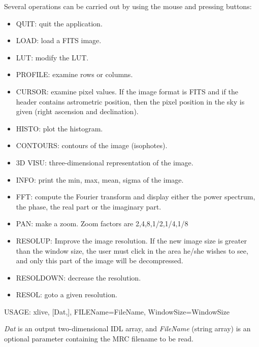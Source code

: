 Several operations can be carried out by using the mouse and pressing buttons:
\begin{itemize}
\baselineskip=0.4truecm
\item QUIT: quit the application.
\item LOAD: load a FITS image. 
\item LUT: modify the LUT.
\item PROFILE: examine rows or columns.
\item CURSOR: examine pixel values. If the image format is FITS and if
the header contains astrometric position, then the pixel
position in the sky is given (right ascension and declination).
\item HISTO: plot the histogram.
\item CONTOURS: contours of the image (isophotes).
\item 3D VISU: three-dimensional representation of the image.
\item INFO: print the min, max, mean, sigma of the image.
\item FFT: compute the Fourier transform and display either the power 
spectrum, the phase, the real part or the imaginary part.
\item PAN: make a zoom. Zoom factors are 2,4,8,1/2,1/4,1/8
\item RESOLUP: Improve the image resolution. If the new image size is
greater than the window size, the user must click in the area
he/she wishes to see, and only this part of the image will be 
decompressed.
\item RESOLDOWN: decrease the resolution.
\item RESOL: goto a given resolution.\end{itemize}
{\bf
\begin{center}
     USAGE: xlive, [Dat,], FILEName=FileName, WindowSize=WindowSize 
\end{center}}
{\em Dat} is an output two-dimensional IDL array, 
and {\em FileName} (string array)
is an optional parameter containing the MRC filename to be read.  

